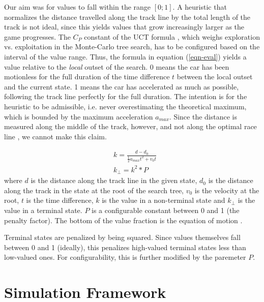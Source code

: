 \documentclass[conference]{IEEEtran}
\begin{document}
Our aim was for values to fall within the range $[0;1]$. A heuristic that normalizes the distance travelled along the track line by the total length of the track is not ideal, since this yields values that grow increasingly larger as the game progresses. The $C_P$ constant of the UCT formula \cite{browne}, which weighs exploration vs. exploitation in the Monte-Carlo tree search, has to be configured based on the interval of the value range. Thus, the formula in equation (\ref{eqn-eval}) yields a value relative to the \emph{local} outset of the search. 0 means the car has been motionless for the full duration of the time difference $t$ between the local outset and the current state. 1 means the car has accelerated as much as possible, following the track line perfectly for the full duration. The intention is for the heuristic to be admissible, i.e. never overestimating the theoretical maximum, which is bounded by the maximum acceleration $a_{max}$. Since the distance is measured along the middle of the track, however, and not along the optimal race line \cite{raceline}, we cannot make this claim.

\begin{equation}
\begin{alignedat}{1}
\label{eqn-eval}
& k = \frac{d - d_0}{\frac{1}{2}a_{max}t^2 + v_0t} \\
& k_\bot = k^2 * P
\end{alignedat}
\end{equation}
where $d$ is the distance along the track line in the given state, $d_0$ is the distance along the track in the state at the root of the search tree, $v_0$ is the velocity at the root, $t$ is the time difference, $k$ is the value in a non-terminal state and $k_\bot$ is the value in a terminal state. $P$ is a configurable constant between 0 and 1 (the penalty factor). The bottom of the value fraction is the equation of motion \cite{motion}.

Terminal states are penalized by being squared. Since values themselves fall between 0 and 1 (ideally), this penalizes high-valued terminal states less than low-valued ones. For configurability, this is further modified by the paremeter $P$.

\section{Simulation Framework}
\label{sec-model}
\end{document}
